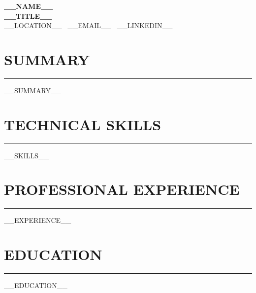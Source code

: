 \documentclass[10pt,letterpaper]{article}
\begin{document}
\begin{center}
    {\LARGE \textbf{__NAME__}} \\
    \vspace{2pt}
    \textbf{__TITLE__} \\
    __LOCATION__ \textbar\ __EMAIL__ \textbar\ __LINKEDIN__
\end{center}

\vspace{-6pt}
\section*{SUMMARY}
\vspace{-4pt}
\hrule
\vspace{4pt}
__SUMMARY__

\section*{TECHNICAL SKILLS}
\vspace{-4pt}
\hrule
\vspace{4pt}
__SKILLS__

\section*{PROFESSIONAL EXPERIENCE}
\vspace{-4pt}
\hrule
\vspace{4pt}
__EXPERIENCE__

\section*{EDUCATION}
\vspace{-4pt}
\hrule
\vspace{4pt}
__EDUCATION__
\end{document}
